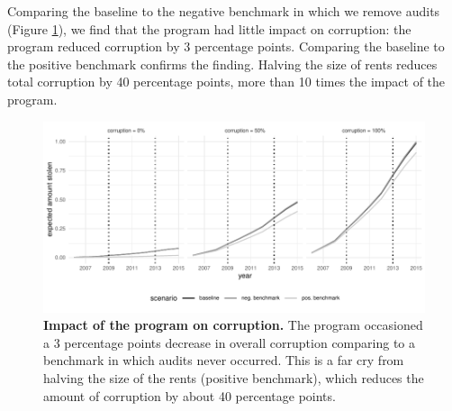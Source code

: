 \documentclass[12pt,a4paper]{article}
\theoremstyle{definition}
\begin{document}
{Comparing the baseline to the negative benchmark in which we remove audits (Figure \ref{fig:counterfactuals1}), we find that the program had little impact on corruption: the program reduced corruption by 3 percentage points. Comparing the baseline to the positive benchmark confirms the finding. Halving the size of rents reduces total corruption by 40 percentage points, more than 10 times the impact of the program. 



\begin{figure}[H]
    \centering
    \includegraphics{figures/counterfactuals1.pdf}
    \caption{{\bf Impact of the program on corruption.} The program occasioned a 3 percentage points decrease in overall corruption comparing to a benchmark in which audits never occurred. This is a far cry from halving the size of the rents (positive benchmark), which reduces the amount of corruption by about 40 percentage points.}
    \label{fig:counterfactuals1}
\end{figure}

}
\end{document}
